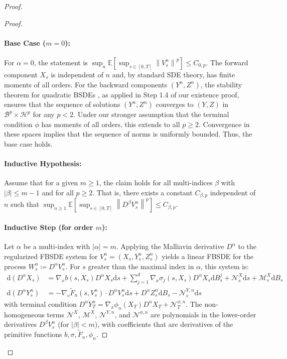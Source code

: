 \documentclass[12pt, letterpaper]{amsart}
\newcommand{\Bcal}{\mathcal{B}}
\newcommand{\Hcalp}[1]{\mathcal{H}^{#1}}
\newcommand{\dd}{\mathrm{d}}
\newcommand{\norm}[1]{\left\lVert#1\right\rVert}
\theoremstyle{plain}
\theoremstyle{definition}
\theoremstyle{remark}
\numberwithin{equation}{section} %
\begin{document}
\begin{proof}
\begin{proof}
\paragraph{\textbf{Base Case ($m=0$):}} For \(\alpha=0\), the statement is \(\sup_n \mathbb{E}[\sup_{s \in [0,T]} \norm{V^n_s}^p] \le C_{0,p}\). The forward component \(X_s\) is independent of \(n\) and, by standard SDE theory, has finite moments of all orders. For the backward components \((Y^n, Z^n)\), the stability theorem for quadratic BSDEs \cite[Theorem 4.2]{Kobylanski2000}, as applied in Step 1.4 of our existence proof, ensures that the sequence of solutions \((Y^n, Z^n)\) converges to \((Y,Z)\) in \(\Bcal^p \times \Hcalp{p}\) for any \(p < 2\). Under our stronger assumption that the terminal condition \(\phi\) has moments of all orders, this extends to all \(p \ge 2\). Convergence in these spaces implies that the sequence of norms is uniformly bounded. Thus, the base case holds.

\paragraph{\textbf{Inductive Hypothesis:}} Assume that for a given \(m \ge 1\), the claim holds for all multi-indices \(\beta\) with \(|\beta| \le m-1\) and for all \(p \ge 2\). That is, there exists a constant \(C_{\beta,p}\) independent of \(n\) such that \(\sup_{n \ge 1}\mathbb{E}[\sup_{s \in [0,T]} \norm{D^\beta V^n_s}^p] \le C_{\beta,p}\).

\paragraph{\textbf{Inductive Step (for order $m$):}} Let \(\alpha\) be a multi-index with \(|\alpha| = m\). Applying the Malliavin derivative \(D^\alpha\) to the regularized FBSDE system for \(V^n_s = (X_s, Y^n_s, Z^n_s)\) yields a linear FBSDE for the process \(W^n_s \coloneqq D^\alpha V^n_s\). For \(s\) greater than the maximal index in \(\alpha\), this system is:
\begin{align}
    \label{eq:fbsde_deriv_fwd_full_proof}
    \dd(D^\alpha X_s) &= \nabla_x b(s,X_s) D^\alpha X_s \dd s + \sum_{j=1}^d \nabla_x \sigma_j(s,X_s) D^\alpha X_s \dd B_s^j + \mathcal{N}^X_s \dd s + \mathcal{M}^X_s \dd B_s \\
    \label{eq:fbsde_deriv_bwd_full_proof}
    \dd(D^\alpha Y^n_s) &= - \nabla_v \tilde{F}_n(s,V^n_s) \cdot D^\alpha V^n_s \dd s + D^\alpha Z^n_s \dd B_s - \mathcal{N}^{Y,n}_s \dd s
\end{align}
with terminal condition \(D^\alpha Y^n_T = \nabla_x \phi_n(X_T) D^\alpha X_T + \mathcal{N}^{\phi,n}_T\).
The non-homogeneous terms \(\mathcal{N}^{X}\), \(\mathcal{M}^{X}\), \(\mathcal{N}^{Y,n}\), and \(\mathcal{N}^{\phi,n}\) are polynomials in the lower-order derivatives \(D^\beta V^n_s\) (for \(|\beta| < m\)), with coefficients that are derivatives of the primitive functions \(b, \sigma, \tilde{F}_n, \phi_n\).


\end{proof}
\end{proof}
\end{document}
